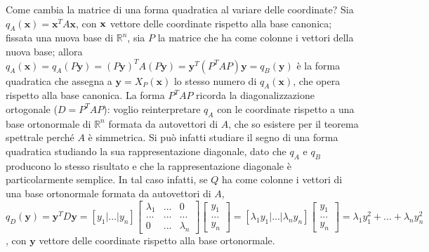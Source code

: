 \documentclass{article}
\begin{document}
Come cambia la matrice di una forma quadratica al variare delle coordinate?
Sia $q_{A}\left( \mathbf{x}\right) =\mathbf{x}^{T}A\mathbf{x}$, con $\mathbf{%
x}$ vettore delle coordinate rispetto alla base canonica; fissata una nuova
base di $%
\mathbb{R}
^{n}$, sia $P$ la matrice che ha come colonne i vettori della nuova base;
allora $q_{A}\left( \mathbf{x}\right) =q_{A}\left( P\mathbf{y}\right)
=\left( P\mathbf{y}\right) ^{T}A\left( P\mathbf{y}\right) =\mathbf{y}%
^{T}\left( P^{T}AP\right) \mathbf{y}=q_{B}\left( \mathbf{y}\right) $ \`{e}
la forma quadratica che assegna a $\mathbf{y}=X_{P}\left( \mathbf{x}\right) $
lo stesso numero di $q_{A}\left( \mathbf{x}\right) $, che opera rispetto
alla base canonica. La forma $P^{T}AP$ ricorda la diagonalizzazione
ortogonale ($D=P^{T}AP$): voglio reinterpretare $q_{A}$ con le coordinate
rispetto a una base ortonormale di $%
\mathbb{R}
^{n}$ formata da autovettori di $A$, che so esistere per il teorema
spettrale perch\'{e} $A$ \`{e} simmetrica. Si pu\`{o} infatti studiare il
segno di una forma quadratica studiando la sua rappresentazione diagonale,
dato che $q_{A}$ e $q_{B}$ producono lo stesso risultato e che la
rappresentazione diagonale \`{e} particolarmente semplice. In tal caso
infatti, se $Q$ ha come colonne i vettori di una base ortonormale formata da
autovettori di $A$, $q_{D}\left( \mathbf{y}\right) =\mathbf{y}^{T}D\mathbf{y=%
}\left[ y_{1}|...|y_{n}\right] \left[ 
\begin{array}{ccc}
\lambda _{1} & ... & 0 \\ 
... & ... & ... \\ 
0 & ... & \lambda _{n}%
\end{array}%
\right] \left[ 
\begin{array}{c}
y_{1} \\ 
... \\ 
y_{n}%
\end{array}%
\right] =\left[ \lambda _{1}y_{1}|...|\lambda _{n}y_{n}\right] \left[ 
\begin{array}{c}
y_{1} \\ 
... \\ 
y_{n}%
\end{array}%
\right] =\lambda _{1}y_{1}^{2}+...+\lambda _{n}y_{n}^{2}$, con $\mathbf{y}$
vettore delle coordinate rispetto alla base ortonormale.
\end{document}
